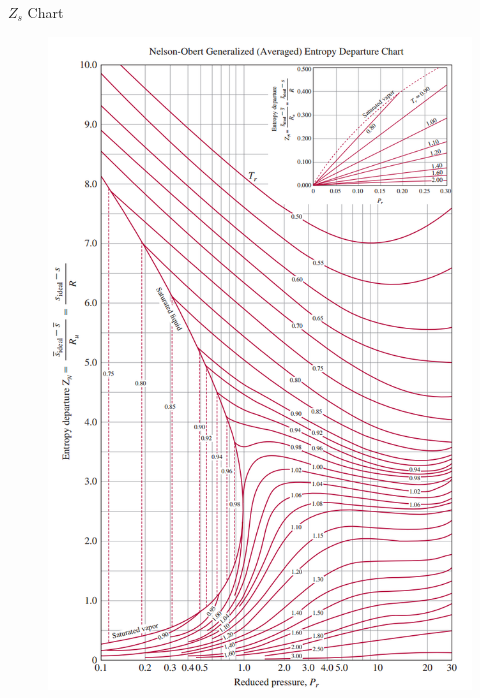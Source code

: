$Z_s$ Chart
\begin{figure}[H]
    \centering
    \includegraphics[width=1.0\linewidth]{images/Z_s_table.png}
\end{figure}
